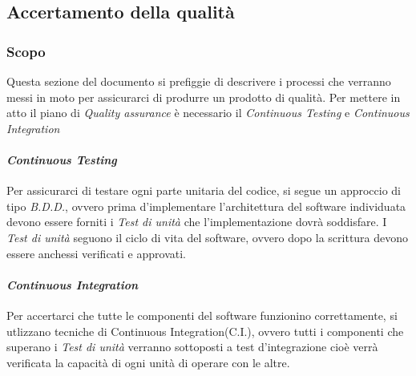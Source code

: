 \subsection{Accertamento della qualit\` a}
\subsubsection{Scopo}
Questa sezione del documento si prefiggie di descrivere i processi che verranno
messi in moto per assicurarci di produrre un prodotto di qualità.
Per mettere in atto il piano di \textit{Quality assurance\glo} è necessario il
\textit{Continuous Testing\glo} e \textit{Continuous Integration\glo}

\paragraph{\textit{Continuous Testing\glo}}
Per assicurarci di testare ogni parte unitaria del codice, si segue un approccio
di tipo \textit{B.D.D.\glo}, ovvero prima d'implementare l'architettura del software
individuata devono essere forniti i \textit{Test di unità\glo} che l'implementazione dovrà soddisfare.
I \textit{Test di unità\glo} seguono il ciclo di vita del software, ovvero dopo la
scrittura devono essere anchessi verificati e approvati.

\paragraph{\textit{Continuous Integration\glo}}
Per accertarci che tutte le componenti del software funzionino correttamente, si
utlizzano tecniche di Continuous Integration(C.I.), ovvero tutti i componenti che
superano i \textit{Test di unità\glo} verranno sottoposti a test d'integrazione
cioè verrà verificata la capacità di ogni unità di operare con le altre.
